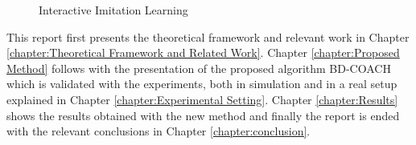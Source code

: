 \begin{figure}[H]
    \centering
    \caption{Interactive Imitation Learning}
    \label{fig:IIL}
\end{figure}



\setlength{\parskip}{1em}

This report first presents the theoretical framework and relevant work in Chapter \ref{chapter:Theoretical Framework and Related Work}. Chapter \ref{chapter:Proposed Method} follows with the presentation of the proposed algorithm BD-COACH which is validated with the experiments, both in simulation and in a real setup explained in Chapter \ref{chapter:Experimental Setting}. Chapter \ref{chapter:Results} shows the results obtained with the new method and finally the report is ended with the relevant conclusions in Chapter \ref{chapter:conclusion}.

